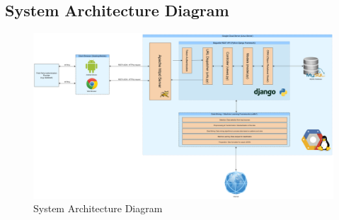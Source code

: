 \clearpage
\begin{landscape}

\section{System Architecture Diagram}

\begin{figure}
  \centering
  \begin{minipage}{180mm}
    \centering
    \includegraphics[width=180mm]{inc/architecture_diagram.jpg}
    \caption{System Architecture Diagram}
    \label{fig:architecture_diagram}
  \end{minipage}
\end{figure}

\end{landscape}
